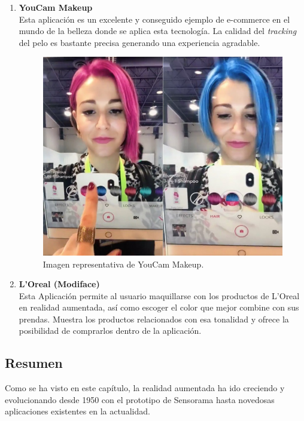\begin{enumerate}[label={\arabic*.}]
 \item
 \textbf{YouCam Makeup}\\
Esta aplicación es un excelente y conseguido ejemplo de e-commerce en el mundo de la belleza donde se aplica esta tecnología. La calidad del \textit{tracking} del pelo es bastante precisa generando una experiencia agradable.
\begin{figure}[H]
    \centering
    \includegraphics{Images/Loreal_App.jpeg}
    \caption[Imagen representativa de YouCam Makeup]{Imagen representativa de YouCam Makeup\footnotemark.}
    \label{fig:YouCam}
\end{figure}
\item \textbf{L’Oreal (Modiface)}\\
Esta Aplicación permite al usuario maquillarse con los productos de L’Oreal en realidad aumentada, así como escoger el color que mejor combine con sus prendas. Muestra los productos relacionados con esa tonalidad y ofrece la posibilidad de comprarlos dentro de la aplicación.
\end{enumerate}

\subsection*{Resumen}
Como se ha visto en este capítulo, la realidad aumentada ha ido creciendo y evolucionando desde 1950 con el prototipo de Sensorama hasta novedosas aplicaciones existentes en la actualidad.\\

